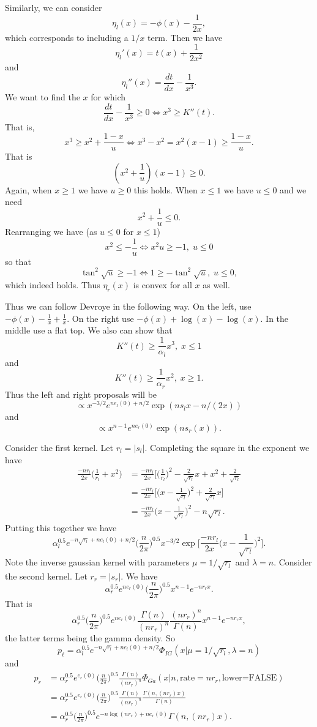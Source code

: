 \documentclass[12pt]{article}
\newcommand{\dd}[2]{\frac{d #1}{d #2}}
\begin{document}
Similarly, we can consider
\[
\eta_l(x) = - \phi(x) - \frac{1}{2x},
\]
which corresponds to including a $1/x$ term.  Then we have
\[
\eta_l'(x) = t(x) + \frac{1}{2x^2}
\]
and
\[
\eta_l''(x) = \dd{t}{x} - \frac{1}{x^3}.
\]
We want to find the $x$ for which
\[
\dd{t}{x} - \frac{1}{x^3} \geq 0 \iff x^3 \geq K''(t).
\]
That is,
\[
x^3 \geq x^2 + \frac{1-x}{u} \iff x^3 - x^2 = x^2 (x-1) \geq \frac{1-x}{u}.
\]
That is
\[
(x^2 + \frac{1}{u}) (x-1) \geq 0.
\]
Again, when $x \geq 1$ we have $u \geq 0$ this holds.  When $x \leq 1$ we have
$u \leq 0$ and we need
\[
x^2 + \frac{1}{u} \leq 0.
\]
Rearranging we have (as $u \leq 0$ for $x \leq 1$)
\[
x^2 \leq - \frac{1}{u} \iff x^2 u \geq -1,  \; u \leq 0
\]
so that
\[
\tan^2 \sqrt{u} \geq -1 \iff 1 \geq -\tan^2{\sqrt{u}}, \; u \leq 0,
\]
which indeed holds.  Thus $\eta_r(x)$ is convex for all $x$ as well.

Thus we can follow Devroye in the following way.  On the left, use $-\phi(x) -
\frac{1}{x} + \frac{1}{x}$.  On the right use $-\phi(x) + \log(x) - \log(x)$.
In the middle use a flat top.  We also can show that
\[
K''(t) \geq \frac{1}{\alpha_l} x^3, \; x \leq 1
\]
and
\[
K''(t) \geq \frac{1}{\alpha_r} x^2, \; x \geq 1.
\]
Thus the left and right proposals will be
\[
\propto x^{-3/2} e^{n e_l(0) + n/2} \exp( n s_l x - n/(2x) )
\]
and
\[
\propto x^{n-1} e^{n e_r(0)} \exp (n s_r(x)).
\]

Consider the first kernel.  Let $r_l = |s_l|$.  Completing the square in the
exponent we have
\begin{align*}
\frac{-n r_l}{2x} \Big( \frac{1}{r_l} + x^2 \Big)
& = \frac{-n r_l}{2x} \Big[ \Big(\frac{1}{r_l}\Big)^2 - \frac{2}{\sqrt{r_l}} x +
x^2 + \frac{2}{\sqrt{r_l}} \\
& = \frac{-n r_l}{2x} \Big[ \Big( x - \frac{1}{\sqrt{r_l}}\Big)^2 +
\frac{2}{\sqrt{r_l}} x \Big] \\
& = \frac{-n r_l}{2x} \Big( x - \frac{1}{\sqrt{r_l}}\Big)^2 - n \sqrt{r_l}.
\end{align*}
Putting this together we have
\[
\alpha_l^{0.5} e^{-n\sqrt{r_l} + n e_l(0)+n/2} \Big(\frac{n}{2\pi}\Big)^{0.5} x^{-3/2} \exp
\Big[  \frac{-n r_l}{2x} \Big( x - \frac{1}{\sqrt{r_l}}\Big)^2 \Big].
\]
Note the inverse gaussian kernel with parameters $\mu = 1/\sqrt{r_l}$ and
$\lambda = n$.  Consider the second kernel.  Let $r_r = |s_r|$.  We have
\[
\alpha_r^{0.5} e^{n e_r(0)} \Big(\frac{n}{2\pi}\Big)^{0.5} x^{n-1} e^{-n r_r x}.
\]
That is
\[
\alpha_r^{0.5} \Big(\frac{n}{2\pi}\Big)^{0.5} e^{n e_r(0)}
\frac{\Gamma(n)}{(nr_r)^n} \frac{(nr_r)^n}{\Gamma(n)} x^{n-1} e^{-nr_r x},
\]
the latter terms being the gamma density.  So
\[
p_\ell = \alpha_l^{0.5} e^{-n \sqrt{r_l} + n e_l(0) + n/2} \Phi_{IG}(x | \mu=1/\sqrt{r_l}, \lambda=n)
\]
and
\begin{align*}
p_r & = \alpha_r^{0.5} e^{e_r(0)} \Big(\frac{n}{2\pi}\Big)^{0.5} \frac{\Gamma(n)}{(nr_r)^n} \Phi_{Ga}(x|n, \text{rate}=n r_r,
\text{lower=FALSE}) \\
& = \alpha_r^{0.5} e^{e_r(0)} \Big(\frac{n}{2\pi}\Big)^{0.5} \frac{\Gamma(n)}{(nr_r)^n} \frac{\Gamma(n, (n r_r) x)}{\Gamma(n)}
\\
& = \alpha_r^{0.5}  \Big(\frac{n}{2\pi}\Big)^{0.5} e^{-n \log(nr_r) + n e_r(0)} \Gamma(n, (nr_r)x).
\end{align*}
\end{document}
